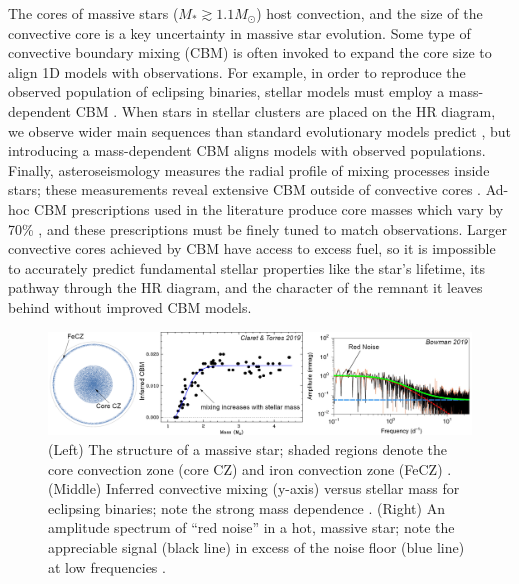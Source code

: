 \documentclass[12pt]{article} %
\begin{document}
The cores of massive stars ($M_* \gtrsim 1.1 M_\odot$) host convection, and the size of the convective core is a key uncertainty in massive star evolution.
Some type of convective boundary mixing (CBM) is often invoked to expand the core size to align 1D models with observations.
For example, in order to reproduce the observed population of eclipsing binaries, stellar models must employ a mass-dependent CBM \citep[see Fig.~\ref{fig:intro}, middle;][]{claret_torres_2019}.
When stars in stellar clusters are placed on the HR diagram, we observe wider main sequences than standard evolutionary models predict \citep{castro_etal_2014,higgins_vink_2019}, but introducing a mass-dependent CBM aligns models with observed populations.
Finally, asteroseismology measures the radial profile of mixing processes inside stars; these measurements reveal extensive CBM outside of convective cores \citep{michielsen_etal_2019,pedersen_etal_2021}.
Ad-hoc CBM prescriptions used in the literature produce core masses which vary by 70\% \citep{kaiser_etal_2020}, and these prescriptions must be finely tuned to match observations.
Larger convective cores achieved by CBM have access to excess fuel, so it is impossible to accurately predict fundamental stellar properties like the star's lifetime, its pathway through the HR diagram, and the character of the remnant it leaves behind without improved CBM models.

\begin{figure}[t!]
     \centering
     \captionsetup{width=0.97\linewidth}
     \includegraphics[width=\textwidth]{fig1.png}
        \caption{(Left) The structure of a massive star; shaded regions denote the core convection zone (core CZ) and iron convection zone (FeCZ) \citep{jermyn_etal_2022_atlas}.
        (Middle) Inferred convective mixing (y-axis) versus stellar mass for eclipsing binaries; note the strong mass dependence \citep{claret_torres_2019}.
        (Right) An amplitude spectrum of ``red noise'' in a hot, massive star; note the appreciable signal (black line) in excess of the noise floor (blue line) at low frequencies \citep{bowman_etal_2019}. 
        \label{fig:intro}}
\end{figure}
\end{document}
